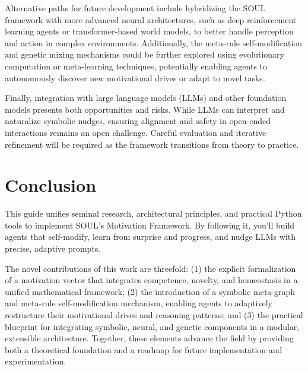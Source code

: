 \documentclass[11pt]{article}
\begin{document}
Alternative paths for future development include hybridizing the SOUL framework with more advanced neural architectures, such as deep reinforcement learning agents or transformer-based world models, to better handle perception and action in complex environments. Additionally, the meta-rule self-modification and genetic mixing mechanisms could be further explored using evolutionary computation or meta-learning techniques, potentially enabling agents to autonomously discover new motivational drives or adapt to novel tasks.

Finally, integration with large language models (LLMs) and other foundation models presents both opportunities and risks. While LLMs can interpret and naturalize symbolic nudges, ensuring alignment and safety in open-ended interactions remains an open challenge. Careful evaluation and iterative refinement will be required as the framework transitions from theory to practice.

\section{Conclusion}
This guide unifies seminal research, architectural principles, and practical Python tools to implement SOUL’s Motivation Framework. By following it, you’ll build agents that self-modify, learn from surprise and progress, and nudge LLMs with precise, adaptive prompts.

The novel contributions of this work are threefold: (1) the explicit formalization of a motivation vector that integrates competence, novelty, and homeostasis in a unified mathematical framework; (2) the introduction of a symbolic meta-graph and meta-rule self-modification mechanism, enabling agents to adaptively restructure their motivational drives and reasoning patterns; and (3) the practical blueprint for integrating symbolic, neural, and genetic components in a modular, extensible architecture. Together, these elements advance the field by providing both a theoretical foundation and a roadmap for future implementation and experimentation.
\end{document}
